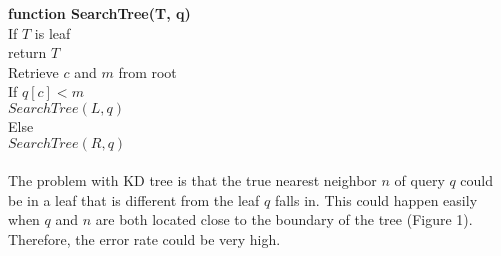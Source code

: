 \documentclass[paper=letter, fontsize=12pt]{article} %
\begin{document}
\hspace*{1em} \textbf{function SearchTree(T, q)}\\
\hspace*{2em} If $T$ is leaf\\
\hspace*{3em} return $T$\\
\hspace*{2em} Retrieve $c$ and $m$ from root\\
\hspace*{2em} If $q[c] < m$\\
\hspace*{3em} $SearchTree(L, q)$\\
\hspace*{2em} Else\\
\hspace*{3em} $SearchTree(R, q)$
\\~\\
The problem with KD tree is that the true nearest neighbor $n$ of query $q$ could be in a leaf that is different from the leaf $q$ falls in. This could happen easily when $q$ and $n$ are both located close to the boundary of the tree (Figure 1). Therefore, the error rate could be very high.
\end{document}
